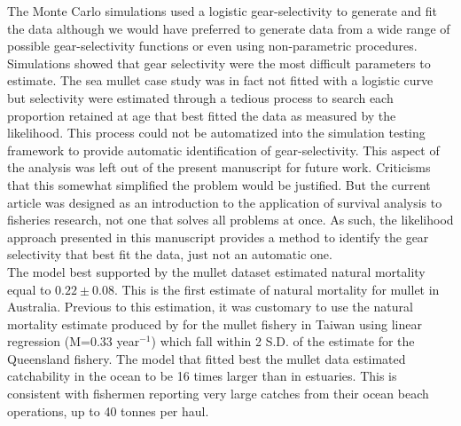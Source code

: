 The Monte Carlo simulations used a logistic gear-selectivity to generate and fit the data although we would have preferred to generate data from a wide range of possible gear-selectivity functions or even using non-parametric procedures. Simulations showed that gear selectivity were the most difficult parameters to estimate. The sea mullet case study was in fact not fitted with a logistic curve but selectivity were estimated through a tedious process to search each proportion retained at age that best fitted the data as measured by the likelihood. This process could not be automatized into the simulation testing framework to provide automatic identification of gear-selectivity. This aspect of the analysis was left out of the present manuscript for future work. Criticisms that this somewhat simplified the problem would be justified. But the current article was designed as an introduction to the application of survival analysis to fisheries research, not one that solves all problems at once. As such, the likelihood approach presented in this manuscript provides a method to identify the gear selectivity that best fit the data, just not an automatic one. \\ 





The model best supported by the mullet dataset estimated natural mortality equal to $0.22 \pm 0.08$. This is the first estimate of natural mortality for mullet in Australia. Previous to this estimation, it was customary to use the natural mortality estimate produced by \cite{Hwang82a} for the mullet fishery in Taiwan using linear regression (M=0.33 year$^{-1}$) which fall within 2 S.D. of the estimate for the Queensland fishery. The model that fitted best the mullet data estimated catchability in the ocean to be 16 times larger than in estuaries. This is consistent with fishermen reporting very large catches from their ocean beach operations, up to 40 tonnes per haul.\\

